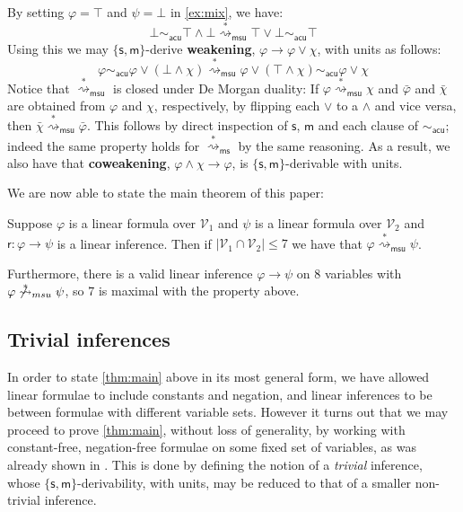 \documentclass[a4paper, UKenglish, cleveref]{lipics-v2021}
\renewcommand{\phi}{\varphi}
\newcommand{\V}{\ensuremath{\mathcal{V}}}
\newcommand{\m}{\ensuremath{\mathsf{m}}}
\newcommand{\s}{\ensuremath{\mathsf{s}}}
\newcommand{\ms}{\ensuremath{\mathsf{ms}}}
\newcommand{\msu}{\ensuremath{\mathsf{msu}}}
\newcommand{\acu}{\ensuremath{\mathsf{acu}}}
\newcommand{\red}{\ensuremath{\overset{*}{\rightsquigarrow}}}
\newcommand{\redms}{\ensuremath{\red_\ms}}
\newcommand{\redmsu}{\ensuremath{\red_\msu}}
\begin{document}
\begin{example}
\label{example-weakening-duality}
By setting $\phi = \top$ and $\psi = \bot$ in \cref{ex:mix}, we have:
\[
\bot \sim_\acu \top \land \bot \redmsu \top \lor \bot \sim_\acu \top
\]
Using this we may $\{\s,\m\}$-derive \textbf{weakening}, $\phi \to \phi \lor \chi$, with units as follows:
\[
\phi \sim_\acu \phi \lor (\bot \land \chi) \redmsu \phi \lor (\top \land \chi) \sim_\acu \phi \lor \chi
\]
Notice that $\redmsu$ is closed under De Morgan duality:
If $\phi \redmsu \chi$ and $\bar \phi$ and $\bar \chi$ are obtained from $\phi$ and $\chi$, respectively, by flipping each $\lor$ to a $\land$ and vice versa, then $\bar \chi\redmsu \bar \phi$.
This follows by direct inspection of $\s$, $\m$ and each clause of $\sim_\acu$; indeed the same property holds for $\redms$ by the same reasoning.
%
As a result, we also have that \textbf{coweakening}, $\phi \land \chi \to \phi$, is $\{\s,\m\}$-derivable with units.
\end{example}

We are now able to state the main theorem of this paper:
\begin{theorem}
  \label{thm:main}
  Suppose \(\phi\) is a linear formula over \(\V_1\) and \(\psi\) is a linear formula over \(\V_2\) and \(\mathsf r : \phi \to \psi\) is a linear inference. Then if \(|\V_1 \cap \V_2| \leq 7\) we have that \(\phi \redmsu \psi\).

  Furthermore, there is a valid linear inference \(\phi \to \psi\) on \(8\) variables with \(\phi \not \redmsu \psi\), so \(7\) is maximal with the property above.
\end{theorem}

\subsection{Trivial inferences}
\label{sec:trivial}
In order to state \cref{thm:main} above in its most general form, we have allowed linear formulae to include constants and negation, and linear inferences to be between formulae with different variable sets.
However
it turns out that we may proceed to prove \cref{thm:main}, without loss of generality, by working with constant-free, negation-free formulae on some fixed set of variables, as was already shown in \cite{Das13:lin-inf-rew}. This is done by defining the notion of a \emph{trivial} inference, whose $\{\s,\m \}$-derivability, with units, may be reduced to that of a smaller non-trivial inference.
\end{document}
